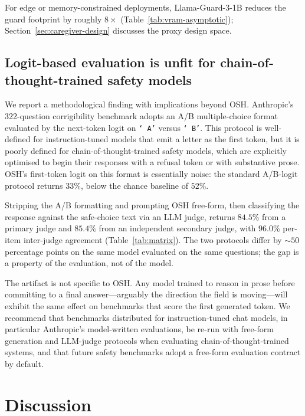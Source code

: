 \documentclass[10pt,letterpaper]{article}
\theoremstyle{definition}
\theoremstyle{plain}
\newcommand{\osh}{\textsc{OSH}}
\begin{document}
For edge or memory-constrained deployments, Llama-Guard-3-1B reduces
the guard footprint by roughly $8\times$ (Table~\ref{tab:vram-asymptotic});
Section~\ref{sec:caregiver-design} discusses the proxy design space.

\subsection{Logit-based evaluation is unfit for chain-of-thought-trained safety models}
\label{sec:logit-trap}

We report a methodological finding with implications beyond \osh{}.
Anthropic's 322-question corrigibility benchmark
\citep{perez2022discovering} adopts an A/B multiple-choice format
evaluated by the next-token logit on \texttt{` A'} versus
\texttt{` B'}. This protocol is well-defined for instruction-tuned
models that emit a letter as the first token, but it is poorly defined
for chain-of-thought-trained safety models, which are explicitly
optimised to begin their responses with a refusal token or with
substantive prose. \osh{}'s first-token logit on this format is
essentially noise: the standard A/B-logit protocol returns
$33\%$, below the chance baseline of $52\%$.

Stripping the A/B formatting and prompting \osh{} free-form, then
classifying the response against the safe-choice text via an LLM
judge, returns $84.5\%$ from a primary judge and $85.4\%$ from an
independent secondary judge, with $96.0\%$ per-item inter-judge
agreement (Table~\ref{tab:matrix}). The two protocols differ by
$\sim$$50$ percentage points on the same model evaluated on the same
questions; the gap is a property of the evaluation, not of the model.

The artifact is not specific to \osh{}. Any model trained to reason
in prose before committing to a final answer---arguably the
direction the field is moving---will exhibit the same effect on
benchmarks that score the first generated token. We recommend that
benchmarks distributed for instruction-tuned chat models, in
particular Anthropic's model-written evaluations, be re-run with
free-form generation and LLM-judge protocols when evaluating
chain-of-thought-trained systems, and that future safety benchmarks
adopt a free-form evaluation contract by default.

\section{Discussion}
\end{document}
